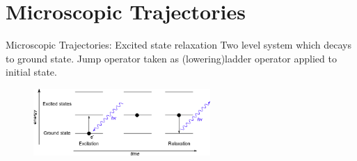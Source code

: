 \documentclass{beamer}
\begin{document}
\section{Microscopic Trajectories}
\begin{frame}{Microscopic Trajectories: Excited state relaxation}
	Two level system which decays to ground state.
	Jump operator taken as (lowering)ladder operator applied to initial state.
	\begin{figure}[h]
		\centering
		\includegraphics[width=0.6\textwidth]{figs/relaxation.png}
		\label{fig:digraph}
	\end{figure}
\end{frame}
\end{document}

